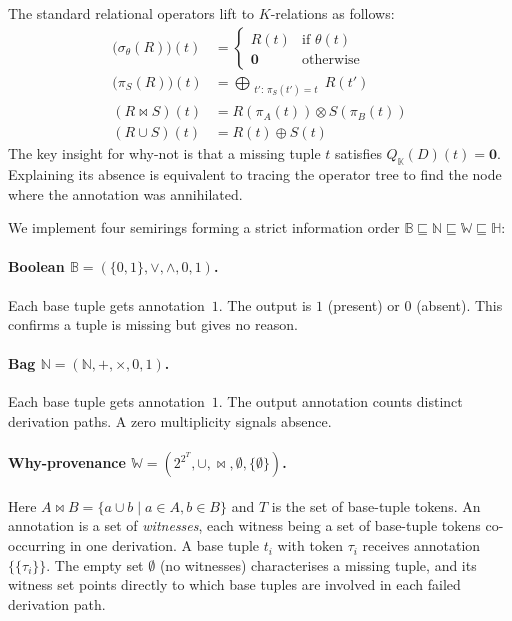\documentclass{llncs}
\begin{document}
The standard relational operators lift to $K$-relations as follows:
\begin{align}
  \bigl(\sigma_\theta(R)\bigr)(t)
    &= \begin{cases} R(t) & \text{if } \theta(t) \\ \mathbf{0} & \text{otherwise} \end{cases}
    \label{eq:select}\\[2pt]
  \bigl(\pi_S(R)\bigr)(t)
    &= \bigoplus_{\substack{t':\,\pi_S(t')=t}} R(t')
    \label{eq:project}\\[2pt]
  (R \bowtie S)(t)
    &= R\!\left(\pi_A(t)\right) \otimes S\!\left(\pi_B(t)\right)
    \label{eq:join}\\[2pt]
  (R \cup S)(t)
    &= R(t) \oplus S(t)
    \label{eq:union}
\end{align}
The key insight for why-not is that a missing tuple $t$ satisfies
$Q_{\mathbb{K}}(D)(t) = \mathbf{0}$. Explaining its absence is
equivalent to tracing the operator tree to find the node where the
annotation was annihilated.

We implement four semirings forming a strict information order
$\mathbb{B} \sqsubseteq \mathbb{N} \sqsubseteq \mathbb{W} \sqsubseteq \mathbb{H}$:

\paragraph{Boolean $\mathbb{B} = (\{0,1\}, \vee, \wedge, 0, 1)$.}
Each base tuple gets annotation~$1$. The output is $1$ (present) or
$0$ (absent). This confirms a tuple is missing but gives no reason.

\paragraph{Bag $\mathbb{N} = (\mathbb{N}, +, \times, 0, 1)$.}
Each base tuple gets annotation~$1$. The output annotation counts
distinct derivation paths. A zero multiplicity signals absence.

\paragraph{Why-provenance $\mathbb{W} = (2^{2^T}, \cup, \bowtie, \emptyset, \{\emptyset\})$.}
Here $A \bowtie B = \{a \cup b \mid a \in A, b \in B\}$ and $T$ is the
set of base-tuple tokens. An annotation is a set of \emph{witnesses},
each witness being a set of base-tuple tokens co-occurring in one
derivation. A base tuple $t_i$ with token $\tau_i$ receives annotation
$\{\{\tau_i\}\}$. The empty set $\emptyset$ (no witnesses) characterises
a missing tuple, and its witness set points directly to which base
tuples are involved in each failed derivation path.
\end{document}
